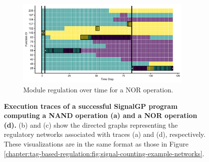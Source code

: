 \begin{figure}
\begin{subfigure}[b]{0.75\textwidth}
    \centering
    \includegraphics[width=0.95\textwidth]{chapters/05-tag-based-genetic-regulation/media/boolean-calc-prefix-networks/case-study-trace-id-24400-test_id-134-regulator-state-horizontal-nolegend.pdf}
    \caption{\small Module regulation over time for a NOR operation.}
    \label{chapter:tag-based-regulation:subfig:bc-nor-exec-trace}
\end{subfigure}%

\caption{\small 
\textbf{Execution traces of a successful SignalGP program computing a NAND operation (a) and a NOR operation (d).}
(b) and (c) show the directed graphs representing the regulatory networks associated with traces (a) and (d), respectively.
These visualizations are in the same format as those in Figure \ref{chapter:tag-based-regulation:fig:signal-counting-example-networks}.}
\label{chapter:tag-based-regulation:fig:boolean-calc-prefix-example-networks}
\end{figure}
